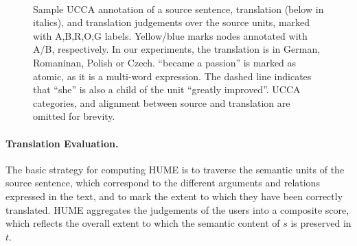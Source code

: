 \documentclass[11pt]{article}
\newcommand{\com}[1]{}
\begin{document}
\begin{figure}
\begin{adjustbox}{trim=2.3cm 0 0 0}
  \\
  \end{adjustbox}

  \caption{\label{fig:ucca_example2}
    Sample UCCA annotation of a source sentence, translation (below in italics), 
    and translation judgements over the source units, marked with A,B,R,O,G labels. Yellow/blue marks
    nodes annotated with A/B, respectively.
    In our experiments, the translation is in German, Romaninan, Polish or Czech.
    ``became a passion'' is marked as atomic, as it is a multi-word expression.
    The dashed line indicates that ``she'' is also a child of the unit ``greatly improved''.
    UCCA categories, and alignment between source and translation are omitted for brevity.}
  
\end{figure}


\paragraph{Translation Evaluation.}
The basic strategy for computing HUME is to traverse the semantic units
of the source sentence, which correspond to the different arguments and relations expressed
in the text, and to mark the extent to which they have been correctly translated.
HUME aggregates the judgements of the users into a composite score, 
which reflects the overall extent to which the semantic content of $s$ is preserved in $t$.
\end{document}
